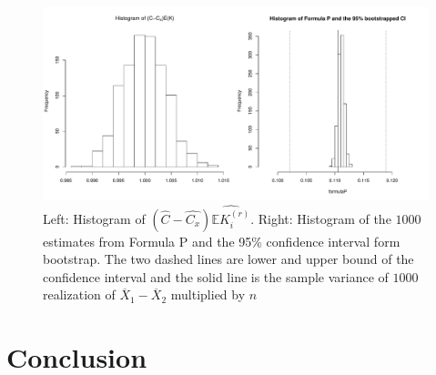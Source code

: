 \documentclass[10pt]{article}
\newcommand{\wht}{\widehat}
\newcommand{\bbe}{\mathbb{E}}
\newcommand{\xbar}{\overline{X}}
\begin{document}
\begin{figure}[!hbtp]
  \centering
  \includegraphics[width=\textwidth]{kfixed5}
    \caption{Left: Histogram of $(\wht{C}-\wht{C_x})\wht{\bbe K_i^{(r)}}$. Right: Histogram of the $1000$ estimates from Formula P and the 95\% confidence interval form bootstrap. The two dashed lines are lower and upper bound of the confidence interval and the solid line is the sample variance of $1000$ realization of $\xbar_1-\xbar_2$ multiplied by $n$}
  \label{fig:kfixed5}
\end{figure}

\section{Conclusion}\label{conclusion}





\end{document}
